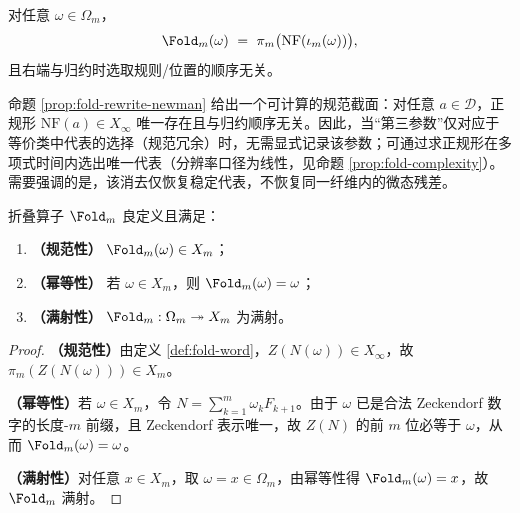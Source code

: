 \begin{corollary}\label{cor:foldm-order-indep}
对任意 $\omega\in\Omega_m$，
\[
\Fold_m(\omega)\ =\ \pi_m\bigl(\mathrm{NF}(\iota_m(\omega))\bigr),
\]
且右端与归约时选取规则/位置的顺序无关。
\end{corollary}

\begin{remark}[规范截面与可计算性]\label{rem:fold-normal-form-computable-section}
命题 \ref{prop:fold-rewrite-newman} 给出一个可计算的规范截面：对任意 $a\in\mathcal{D}$，正规形 $\mathrm{NF}(a)\in X_\infty$ 唯一存在且与归约顺序无关。因此，当“第三参数”仅对应于等价类中代表的选择（规范冗余）时，无需显式记录该参数；可通过求正规形在多项式时间内选出唯一代表（分辨率口径为线性，见命题 \ref{prop:fold-complexity}）。需要强调的是，该消去仅恢复稳定代表，不恢复同一纤维内的微态残差。
\end{remark}



\begin{proposition}\label{prop:fold-basic}
折叠算子 $\Fold_m$ 良定义且满足：
\begin{enumerate}
\normalfont
  \item \textbf{（规范性）} $\Fold_m(\omega)\in X_m$；
  \item \textbf{（幂等性）} 若 $\omega\in X_m$，则 $\Fold_m(\omega)=\omega$；
  \item \textbf{（满射性）} $\Fold_m:\Omega_m\twoheadrightarrow X_m$ 为满射。
\end{enumerate}
\end{proposition}

\begin{proof}
\textbf{（规范性）}由定义 \ref{def:fold-word}，$Z(N(\omega))\in X_\infty$，故 $\pi_m(Z(N(\omega)))\in X_m$。

\textbf{（幂等性）}若 $\omega\in X_m$，令 $N=\sum_{k=1}^m \omega_k F_{k+1}$。由于 $\omega$ 已是合法 Zeckendorf 数字的长度-$m$ 前缀，且 Zeckendorf 表示唯一，故 $Z(N)$ 的前 $m$ 位必等于 $\omega$，从而 $\Fold_m(\omega)=\omega$。

\textbf{（满射性）}对任意 $x\in X_m$，取 $\omega=x\in\Omega_m$，由幂等性得 $\Fold_m(\omega)=x$，故 $\Fold_m$ 满射。
\end{proof}

